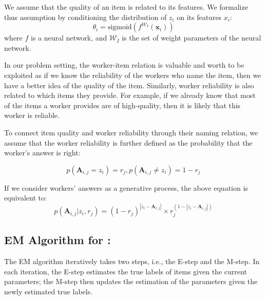 We assume that the quality of an item is related to its features. We formalize thus assumption by conditioning the distribution of $z_i$ on its features $x_i$:
\begin{equation}
    \theta_i  = \text{sigmoid} (f^{\mathcal{W}_I}(\mathbf{x}_i))
    \label{eq:item_features}
\end{equation}
where $f$ is a neural network, and $\mathcal{W}_I$ is the set of weight parameters of the neural network.

In our problem setting, the worker-item relation is valuable and worth to be exploited as if we know the reliability of the workers who name the item, then we have a better idea of the quality of the item. Similarly, worker reliability
is also related to which items they provide. For example, if we already know that most of the items a worker provides are of high-quality, then it is likely that this worker is reliable. 

To connect item quality and worker reliability through their naming relation, we assume that the worker reliability is further defined as the probability that the worker's answer is right:

\begin{equation}
    p(\mathbf{A}_{i,j} = z_i) =  r_j, p(\mathbf{A}_{i,j} \ne z_i) = 1- r_j
    \label{eq:item_worker_rel}
\end{equation}

If we consider workers' answers as a generative process, the above equation is equivalent to:
\begin{equation}
    p(\mathbf{A}_{i,j} | z_i,  r_j) = (1- r_j)^{|z_i-\mathbf{A}_{i,j}|}\times  r_j^{(1-|z_i-\mathbf{A}_{i,j}|)}
    \label{eq:item_worker}
\end{equation}

\subsection{EM Algorithm for \sys:} 
The EM algorithm iteratively takes two steps, i.e., the E-step and the
M-step. In each iteration, the E-step estimates the true labels of items given
the current parameters; the M-step then updates the estimation of
the parameters given the newly estimated true labels.

